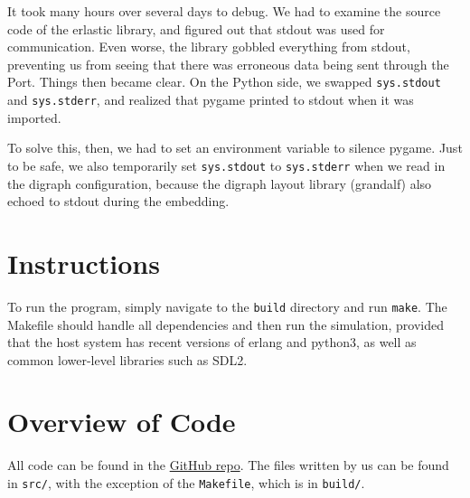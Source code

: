 \documentclass{article}
\newcommand{\ttt}[1]{\texttt{#1}}
\begin{document}
It took many hours over several days to debug. We had to examine the source code of the erlastic library, and figured out that stdout was used for communication. Even worse, the library gobbled everything from stdout, preventing us from seeing that there was erroneous data being sent through the Port. Things then became clear. On the Python side, we swapped \ttt{sys.stdout} and \ttt{sys.stderr}, and realized that pygame printed to stdout when it was imported. 

To solve this, then, we had to set an environment variable to silence pygame. Just to be safe, we also temporarily set \ttt{sys.stdout} to \ttt{sys.stderr} when we read in the digraph configuration, because the digraph layout library (grandalf) also echoed to stdout during the embedding.

\section{Instructions}

To run the program, simply navigate to the \ttt{build} directory and run \ttt{make}. The Makefile should handle all dependencies and then run the simulation, provided that the host system has recent versions of erlang and python3, as well as common lower-level libraries such as SDL2. 

\section{Overview of Code}

All code can be found in the \href{https://github.com/liam-strand/final-project}{GitHub repo}. The files written by us can be found in \ttt{src/}, with the exception of the \ttt{Makefile}, which is in \ttt{build/}.
\end{document}

